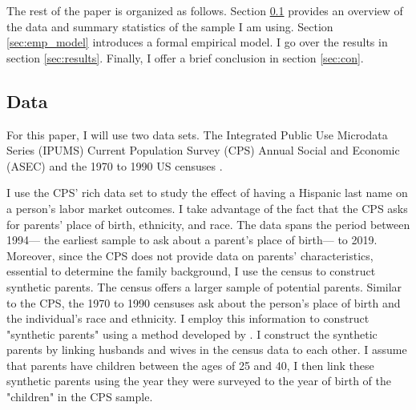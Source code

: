 \documentclass[12pt, fullpage]{article}
\begin{document}
The rest of the paper is organized as follows. Section \ref{sec:data} provides an overview of the data and summary statistics of the sample I am using. Section \ref{sec:emp_model} introduces a formal empirical model. I go over the results in section \ref{sec:results}. Finally, I offer a brief conclusion in section \ref{sec:con}.

\subsection{Data}\label{sec:data}

For this paper, I will use two data sets. The Integrated Public Use Microdata Series (IPUMS) Current Population Survey (CPS) Annual Social and Economic (ASEC) \citep{cps2019} and the 1970 to 1990 US censuses \citep{acs2019}. 

I use the CPS' rich data set to study the effect of having a Hispanic last name on a person's labor market outcomes. I take advantage of the fact that the CPS asks for parents' place of birth, ethnicity, and race. The data spans the period between 1994--- the earliest sample to ask about a parent's place of birth--- to 2019. Moreover, since the CPS does not provide data on parents' characteristics, essential to determine the family background, I use the census to construct synthetic parents. The census offers a larger sample of potential parents. Similar to the CPS, the 1970 to 1990 censuses ask about the person's place of birth and the individual's race and ethnicity. I employ this information to construct "synthetic parents" using a method developed by \citet{rubinstein2014pride}. I construct the synthetic parents by linking husbands and wives in the census data to each other. I assume that parents have children between the ages of 25 and 40, I then link these synthetic parents using the year they were surveyed to the year of birth of the "children" in the CPS sample.
\end{document}
